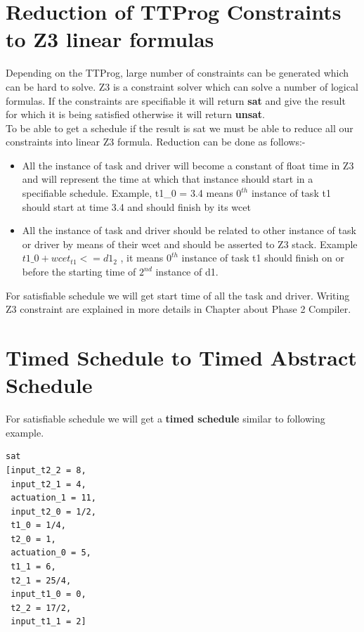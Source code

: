 \documentclass[16pt]{report}
\begin{document}
\section{Reduction of TTProg Constraints to Z3 linear formulas}
Depending on the TTProg, large number of constraints can be generated which can be hard to solve. Z3 is a constraint solver which can solve a number of logical formulas. If the constraints are specifiable it will return \textbf{sat} and give the result for which it is being satisfied otherwise it will return \textbf{unsat}.\\
To be able to get a schedule if the result is sat we must be able to reduce all our constraints into linear Z3 formula. Reduction can be done as follows:-
\begin{itemize}
    \item All the instance of task and driver will become a constant of float time in Z3 and will represent the time at which that instance should start in a specifiable schedule. Example, t1\_0 = 3.4 means $0^{th}$ instance of task t1 should start at time 3.4 and should finish by its wcet
    \item All the instance of task and driver should be related to other instance of task or driver by means of their wcet and should be asserted to Z3 stack. Example $t1\_0 + wcet_{t1} <= d1_{2}$ , it means $0^{th}$ instance of task t1 should finish on or before the starting time of $2^{nd}$ instance of d1.
 \end{itemize}
For satisfiable schedule we will get start time of all the task and driver. Writing Z3 constraint are explained in more details in Chapter about Phase 2 Compiler.

\section{Timed Schedule to Timed Abstract Schedule}
For satisfiable schedule we will get a \textbf{timed schedule} similar to following example.
\begin{verbatim}
sat
[input_t2_2 = 8,
 input_t2_1 = 4,
 actuation_1 = 11,
 input_t2_0 = 1/2,
 t1_0 = 1/4,
 t2_0 = 1,
 actuation_0 = 5,
 t1_1 = 6,
 t2_1 = 25/4,
 input_t1_0 = 0,
 t2_2 = 17/2,
 input_t1_1 = 2]
\end{verbatim}
\end{document}
